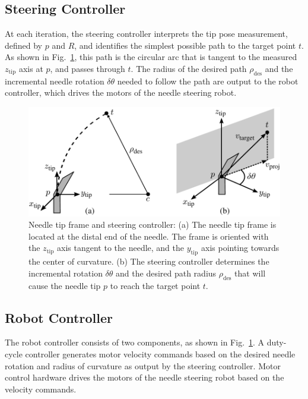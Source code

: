 \subsection{Steering Controller}
At each iteration, the steering controller interprets the tip pose measurement, defined by $p$ and $R$, and identifies the simplest possible path to the target point ${t}$. As shown in Fig.~\ref{fig:ControlAlgorithm}, this path is the circular arc that is tangent to the measured $z_{\text{tip}}$ axis at $p$, and passes through ${t}$. The radius of the desired path $\rho_{\text{des}}$ and the incremental needle rotation $\delta\theta$ needed to follow the path are output to the robot controller, which drives the motors of the needle steering robot.

\begin{figure}[!t]
\centering
\includegraphics[width = 0.75\columnwidth]{Images/Chapter2/ControlAlgorithm/ControlAlgorithm}%
\caption[Needle tip frame and steering controller]{Needle tip frame and steering controller: (a) The needle tip frame is located at the distal end of the needle. The frame is oriented with the $z_{\text{tip}}$ axis tangent to the needle, and the $y_{\text{tip}}$ axis pointing towards the center of curvature. (b) The steering controller determines the incremental rotation $\delta\theta$ and the desired path radius $\rho_{\text{des}}$ that will cause the needle tip $p$ to reach the target point ${t}$.}
\label{fig:ControlAlgorithm}
\end{figure}

\subsection{Robot Controller} 
The robot controller consists of two components, as shown in Fig.~\ref{fig:ControlAlgorithm}. A duty-cycle controller generates motor velocity commands based on the desired needle rotation and radius of curvature as output by the steering controller. Motor control hardware drives the motors of the needle steering robot based on the velocity commands.

